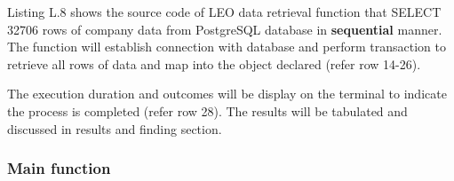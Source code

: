 Listing L.8 shows the source code of LEO data retrieval function that SELECT 32706 rows of company data from PostgreSQL database in \textbf{sequential} manner. The function will establish connection with database and perform transaction to retrieve all rows of data and map into the object declared (refer row 14-26). 

The execution duration and outcomes will be display on the terminal to indicate the process is completed (refer row 28). The results will be tabulated and discussed in results and finding section. 

\newpage 

\subsubsection{Main function}

